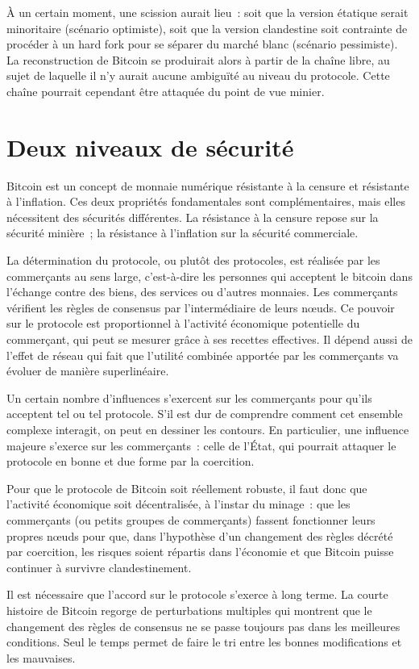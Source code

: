 À un certain moment, une scission aurait lieu~: soit que la version étatique serait minoritaire (scénario optimiste), soit que la version clandestine soit contrainte de procéder à un hard fork pour se séparer du marché blanc (scénario pessimiste). La reconstruction de Bitcoin se produirait alors à partir de la chaîne libre, au sujet de laquelle il n'y aurait aucune ambiguïté au niveau du protocole. Cette chaîne pourrait cependant être attaquée du point de vue minier.

\section*{Deux niveaux de sécurité}

Bitcoin est un concept de monnaie numérique résistante à la censure et résistante à l'inflation. Ces deux propriétés fondamentales sont complémentaires, mais elles nécessitent des sécurités différentes. La résistance à la censure repose sur la sécurité minière~; la résistance à l'inflation sur la sécurité commerciale.

La détermination du protocole, ou plutôt des protocoles, est réalisée par les commerçants au sens large, c'est-à-dire les personnes qui acceptent le bitcoin dans l'échange contre des biens, des services ou d'autres monnaies. Les commerçants vérifient les règles de consensus par l'intermédiaire de leurs nœuds. Ce pouvoir sur le protocole est proportionnel à l'activité économique potentielle du commerçant, qui peut se mesurer grâce à ses recettes effectives. Il dépend aussi de l'effet de réseau qui fait que l'utilité combinée apportée par les commerçants va évoluer de manière superlinéaire.

Un certain nombre d'influences s'exercent sur les commerçants pour qu'ils acceptent tel ou tel protocole. S'il est dur de comprendre comment cet ensemble complexe interagit, on peut en dessiner les contours. En particulier, une influence majeure s'exerce sur les commerçants~: celle de l'État, qui pourrait attaquer le protocole en bonne et due forme par la coercition.

Pour que le protocole de Bitcoin soit réellement robuste, il faut donc que l'activité économique soit décentralisée, à l'instar du minage~: que les commerçants (ou petits groupes de commerçants) fassent fonctionner leurs propres nœuds pour que, dans l'hypothèse d'un changement des règles décrété par coercition, les risques soient répartis dans l'économie et que Bitcoin puisse continuer à survivre clandestinement.

Il est nécessaire que l'accord sur le protocole s'exerce à long terme. La courte histoire de Bitcoin regorge de perturbations multiples qui montrent que le changement des règles de consensus ne se passe toujours pas dans les meilleures conditions. Seul le temps permet de faire le tri entre les bonnes modifications et les mauvaises.

\printendnotes
